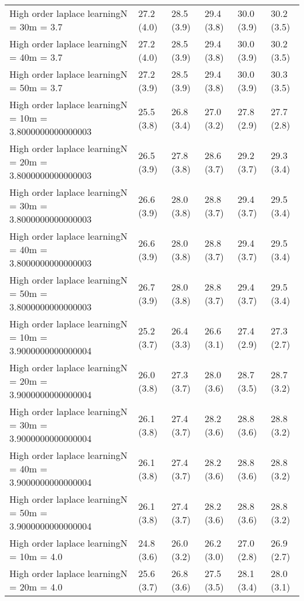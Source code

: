 \documentclass{article}
\begin{document}
\begin{table*}[t!]
\begin{center}
\begin{small}
\begin{sc}
\begin{tabular}{llllll}
High order laplace learningN = 30m = 3.7&27.2 (4.0)      &28.5 (3.9)      &29.4 (3.8)      &30.0 (3.9)      &30.2 (3.5)      \\
High order laplace learningN = 40m = 3.7&27.2 (4.0)      &28.5 (3.9)      &29.4 (3.8)      &30.0 (3.9)      &30.2 (3.5)      \\
High order laplace learningN = 50m = 3.7&27.2 (3.9)      &28.5 (3.9)      &29.4 (3.8)      &30.0 (3.9)      &30.3 (3.5)      \\
High order laplace learningN = 10m = 3.8000000000000003&25.5 (3.8)      &26.8 (3.4)      &27.0 (3.2)      &27.8 (2.9)      &27.7 (2.8)      \\
High order laplace learningN = 20m = 3.8000000000000003&26.5 (3.9)      &27.8 (3.8)      &28.6 (3.7)      &29.2 (3.7)      &29.3 (3.4)      \\
High order laplace learningN = 30m = 3.8000000000000003&26.6 (3.9)      &28.0 (3.8)      &28.8 (3.7)      &29.4 (3.7)      &29.5 (3.4)      \\
High order laplace learningN = 40m = 3.8000000000000003&26.6 (3.9)      &28.0 (3.8)      &28.8 (3.7)      &29.4 (3.7)      &29.5 (3.4)      \\
High order laplace learningN = 50m = 3.8000000000000003&26.7 (3.9)      &28.0 (3.8)      &28.8 (3.7)      &29.4 (3.7)      &29.5 (3.4)      \\
High order laplace learningN = 10m = 3.9000000000000004&25.2 (3.7)      &26.4 (3.3)      &26.6 (3.1)      &27.4 (2.9)      &27.3 (2.7)      \\
High order laplace learningN = 20m = 3.9000000000000004&26.0 (3.8)      &27.3 (3.7)      &28.0 (3.6)      &28.7 (3.5)      &28.7 (3.2)      \\
High order laplace learningN = 30m = 3.9000000000000004&26.1 (3.8)      &27.4 (3.7)      &28.2 (3.6)      &28.8 (3.6)      &28.8 (3.2)      \\
High order laplace learningN = 40m = 3.9000000000000004&26.1 (3.8)      &27.4 (3.7)      &28.2 (3.6)      &28.8 (3.6)      &28.8 (3.2)      \\
High order laplace learningN = 50m = 3.9000000000000004&26.1 (3.8)      &27.4 (3.7)      &28.2 (3.6)      &28.8 (3.6)      &28.8 (3.2)      \\
High order laplace learningN = 10m = 4.0&24.8 (3.6)      &26.0 (3.2)      &26.2 (3.0)      &27.0 (2.8)      &26.9 (2.7)      \\
High order laplace learningN = 20m = 4.0&25.6 (3.7)      &26.8 (3.6)      &27.5 (3.5)      &28.1 (3.4)      &28.0 (3.1)      \\

\end{tabular}
\end{sc}
\end{small}
\end{center}
\end{table*}
\end{document}
